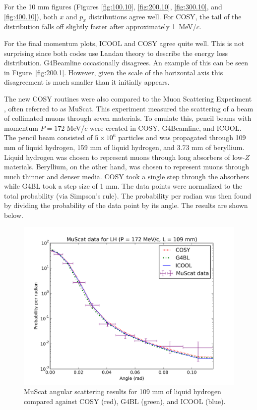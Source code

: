 For the 10 mm figures (Figures \ref{fig:100.10}, \ref{fig:200.10}, \ref{fig:300.10}, and \ref{fig:400.10}), both $x$ and $p_x$ distributions agree well. For COSY, the tail of the distribution falls off slightly faster after approximately 1~MeV/$c$. 

For the final momentum plots, ICOOL and COSY agree quite well. This is not surprising since both codes use Landau theory to describe the energy loss distribution. G4Beamline occasionally disagrees. An example of this can be seen in Figure~\ref{fig:200.1}. However, given the scale of the horizontal axis this disagreement is much smaller than it initially appears.

\label{sec:validation}

The new COSY routines were also compared to the Muon Scattering Experiment \cite{muscat}, often referred to as MuScat. This experiment measured the scattering of a beam of collimated muons through seven materials. To emulate this, pencil beams with momentum $P=172$ MeV/$c$ were created in COSY, G4Beamline, and ICOOL. The pencil beam consisted of $5\times10^6$ particles and was propagated through 109 mm of liquid hydrogen, 159 mm of liquid hydrogen, and 3.73 mm of beryllium. Liquid hydrogen was chosen to represent muons through long absorbers of low-$Z$ materials. Beryllium, on the other hand, was chosen to represent muons through much thinner and denser media. COSY took a single step through the absorbers while G4BL took a step size of 1 mm. The data points were normalized to the total probability (via Simpson's rule). The probability per radian was then found by dividing the probability of the data point by its angle. The results are shown below.

\begin{figure}[H]
  \centering
    \includegraphics[width=\textwidth]{Figures/172.109.muscat} 
  \caption{MuScat angular scattering results for 109 mm of liquid hydrogen compared against COSY (red), G4BL (green), and ICOOL (blue).}
  \label{fig:172.109.muscat}
\end{figure}

